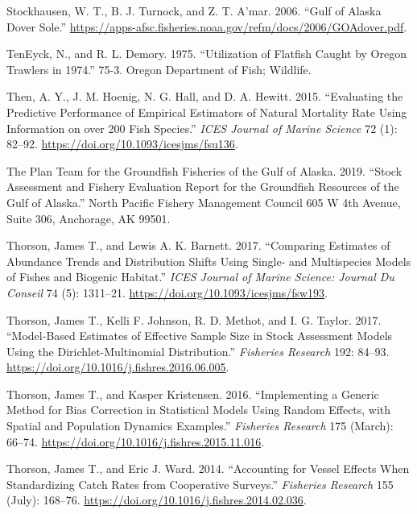 \documentclass[11pt,
  english,
  a4paper,
]{article}
\begin{document}
\begin{cslreferences}
\leavevmode\hypertarget{ref-stockhausen_gulf_2006}{}%
Stockhausen, W. T., B. J. Turnock, and Z. T. A'mar. 2006. ``Gulf of Alaska Dover Sole.'' \url{https://apps-afsc.fisheries.noaa.gov/refm/docs/2006/GOAdover.pdf}.

\leavevmode\hypertarget{ref-teneyck_utilization_1975}{}%
TenEyck, N., and R. L. Demory. 1975. ``Utilization of Flatfish Caught by Oregon Trawlers in 1974.'' 75-3. Oregon Department of Fish; Wildlife.

\leavevmode\hypertarget{ref-then_evaluating_2015}{}%
Then, A. Y., J. M. Hoenig, N. G. Hall, and D. A. Hewitt. 2015. ``Evaluating the Predictive Performance of Empirical Estimators of Natural Mortality Rate Using Information on over 200 Fish Species.'' \emph{ICES Journal of Marine Science} 72 (1): 82--92. \url{https://doi.org/10.1093/icesjms/fsu136}.

\leavevmode\hypertarget{ref-the_plan_team_for_the_groundfish_fisheries_of_the_gulf_of_alaska_stock_2019}{}%
The Plan Team for the Groundfish Fisheries of the Gulf of Alaska. 2019. ``Stock Assessment and Fishery Evaluation Report for the Groundfish Resources of the Gulf of Alaska.'' North Pacific Fishery Management Council 605 W 4th Avenue, Suite 306, Anchorage, AK 99501.

\leavevmode\hypertarget{ref-thorson_comparing_2017}{}%
Thorson, James T., and Lewis A. K. Barnett. 2017. ``Comparing Estimates of Abundance Trends and Distribution Shifts Using Single- and Multispecies Models of Fishes and Biogenic Habitat.'' \emph{ICES Journal of Marine Science: Journal Du Conseil} 74 (5): 1311--21. \url{https://doi.org/10.1093/icesjms/fsw193}.

\leavevmode\hypertarget{ref-thorson_model-based_2017}{}%
Thorson, James T., Kelli F. Johnson, R. D. Methot, and I. G. Taylor. 2017. ``Model-Based Estimates of Effective Sample Size in Stock Assessment Models Using the Dirichlet-Multinomial Distribution.'' \emph{Fisheries Research} 192: 84--93. \url{https://doi.org/10.1016/j.fishres.2016.06.005}.

\leavevmode\hypertarget{ref-thorson_implementing_2016}{}%
Thorson, James T., and Kasper Kristensen. 2016. ``Implementing a Generic Method for Bias Correction in Statistical Models Using Random Effects, with Spatial and Population Dynamics Examples.'' \emph{Fisheries Research} 175 (March): 66--74. \url{https://doi.org/10.1016/j.fishres.2015.11.016}.

\leavevmode\hypertarget{ref-thorson_accounting_2014}{}%
Thorson, James T., and Eric J. Ward. 2014. ``Accounting for Vessel Effects When Standardizing Catch Rates from Cooperative Surveys.'' \emph{Fisheries Research} 155 (July): 168--76. \url{https://doi.org/10.1016/j.fishres.2014.02.036}.


\end{cslreferences}
\end{document}

